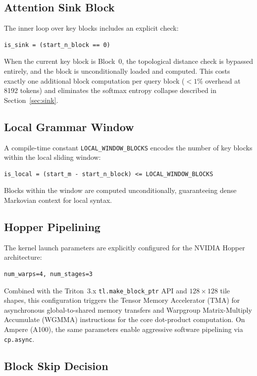 \documentclass[11pt,a4paper]{article}
\begin{document}
\subsection{Attention Sink Block}

The inner loop over key blocks includes an explicit check:
\begin{verbatim}
is_sink = (start_n_block == 0)
\end{verbatim}
When the current key block is Block~0, the topological distance check is bypassed entirely, and the block is unconditionally loaded and computed. This costs exactly one additional block computation per query block ($< 1$\% overhead at 8192 tokens) and eliminates the softmax entropy collapse described in Section~\ref{sec:sink}.

\subsection{Local Grammar Window}

A compile-time constant \texttt{LOCAL\_WINDOW\_BLOCKS} encodes the number of key blocks within the local sliding window:
\begin{verbatim}
is_local = (start_m - start_n_block) <= LOCAL_WINDOW_BLOCKS
\end{verbatim}
Blocks within the window are computed unconditionally, guaranteeing dense Markovian context for local syntax.

\subsection{Hopper Pipelining}

The kernel launch parameters are explicitly configured for the NVIDIA Hopper architecture:
\begin{verbatim}
num_warps=4, num_stages=3
\end{verbatim}
Combined with the Triton~3.x \texttt{tl.make\_block\_ptr} API and $128 \times 128$ tile shapes, this configuration triggers the Tensor Memory Accelerator (TMA) for asynchronous global-to-shared memory transfers and Warpgroup Matrix-Multiply Accumulate (WGMMA) instructions for the core dot-product computation. On Ampere (A100), the same parameters enable aggressive software pipelining via \texttt{cp.async}.

\subsection{Block Skip Decision}
\end{document}

